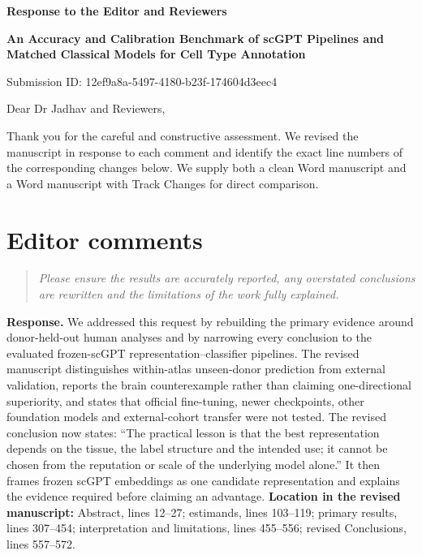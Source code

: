 \documentclass[10pt,a4paper]{article}
\newcommand{\commenttext}[1]{\begin{quote}\colorbox{gray!15}{\parbox{0.91\linewidth}{\itshape #1}}\end{quote}}
\begin{document}
\begin{center}
{\Large\bfseries Response to the Editor and Reviewers\par}
\vspace{0.35cm}
{\large\bfseries An Accuracy and Calibration Benchmark of scGPT Pipelines and Matched Classical Models for Cell Type Annotation\par}
\vspace{0.25cm}
{Submission ID: 12ef9a8a-5497-4180-b23f-174604d3eec4\par}
\end{center}
\vspace{0.35cm}

Dear Dr Jadhav and Reviewers,


Thank you for the careful and constructive assessment. We revised the manuscript in response to each comment and identify the exact line numbers of the corresponding changes below. We supply both a clean Word manuscript and a Word manuscript with Track Changes for direct comparison.


\section*{Editor comments}

\commenttext{Please ensure the results are accurately reported, any overstated conclusions are rewritten and the limitations of the work fully explained.}

\textcolor{responseblue}{\textbf{Response.}} We addressed this request by rebuilding the primary evidence around donor-held-out human analyses and by narrowing every conclusion to the evaluated frozen-scGPT representation--classifier pipelines. The revised manuscript distinguishes within-atlas unseen-donor prediction from external validation, reports the brain counterexample rather than claiming one-directional superiority, and states that official fine-tuning, newer checkpoints, other foundation models and external-cohort transfer were not tested. The revised conclusion now states: ``The practical lesson is that the best representation depends on the tissue, the label structure and the intended use; it cannot be chosen from the reputation or scale of the underlying model alone.'' It then frames frozen scGPT embeddings as one candidate representation and explains the evidence required before claiming an advantage. \textbf{Location in the revised manuscript:} Abstract, lines 12--27; estimands, lines 103--119; primary results, lines 307--454; interpretation and limitations, lines 455--556; revised Conclusions, lines 557--572.
\end{document}
